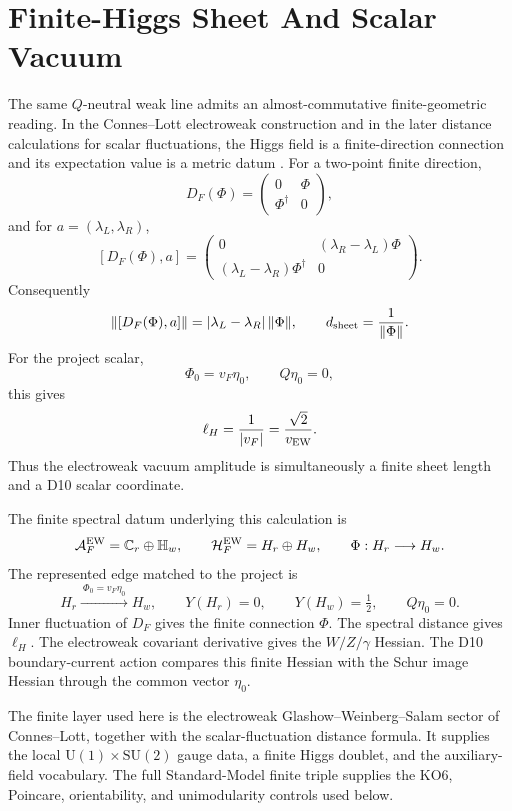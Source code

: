 \documentclass[11pt]{article}
\theoremstyle{definition}
\theoremstyle{remark}
\newcommand{\SU}{\mathrm{SU}}
\newcommand{\U}{\mathrm{U}}
\newcommand{\C}{\mathbb{C}}
\newcommand{\half}{\tfrac12}
\newcommand{\cA}{\mathcal A}
\newcommand{\cH}{\mathcal H}
\begin{document}

\section{Finite-Higgs Sheet And Scalar Vacuum}

The same \(Q\)-neutral weak line admits an almost-commutative
finite-geometric reading.  In the Connes--Lott electroweak construction and in
the later distance calculations for scalar fluctuations, the Higgs field is a
finite-direction connection and its expectation value is a metric datum
\cite{ConnesLott1990,Connes1989,MartinettiWulkenhaar2002}.  For a two-point
finite direction,
\[
  D_F(\Phi)=
  \begin{pmatrix}
  0&\Phi\\
  \Phi^\dagger&0
  \end{pmatrix},
\]
and for \(a=(\lambda_L,\lambda_R)\),
\[
  [D_F(\Phi),a]=
  \begin{pmatrix}
  0&(\lambda_R-\lambda_L)\Phi\\
  (\lambda_L-\lambda_R)\Phi^\dagger&0
  \end{pmatrix}.
\]
Consequently
\[
  \|[D_F(\Phi),a]\|
  =
  |\lambda_L-\lambda_R|\,\|\Phi\|,
  \qquad
  d_{\rm sheet}=\frac{1}{\|\Phi\|}.
\]
For the project scalar,
\[
  \Phi_0=v_F\eta_0,\qquad Q\eta_0=0,
\]
this gives
\[
  \ell_H=\frac{1}{|v_F|}
  =
  \frac{\sqrt2}{v_{\rm EW}}.
\]
Thus the electroweak vacuum amplitude is simultaneously a finite sheet length
and a D10 scalar coordinate.

The finite spectral datum underlying this calculation is
\[
  \cA_F^{\rm EW}=\C_r\oplus{\mathbb H}_w,\qquad
  \cH_F^{\rm EW}=H_r\oplus H_w,\qquad
  \Phi:H_r\longrightarrow H_w .
\]
The represented edge matched to the project is
\[
  H_r\xrightarrow{\ \Phi_0=v_F\eta_0\ }H_w,
  \qquad
  Y(H_r)=0,\qquad
  Y(H_w)=\half,\qquad
  Q\eta_0=0 .
\]
Inner fluctuation of \(D_F\) gives the finite connection \(\Phi\).  The
spectral distance gives \(\ell_H\).  The electroweak covariant derivative gives
the \(W/Z/\gamma\) Hessian.  The D10 boundary-current action compares this
finite Hessian with the Schur image Hessian through the common vector
\(\eta_0\).

The finite layer used here is the electroweak Glashow--Weinberg--Salam sector
of Connes--Lott, together with the scalar-fluctuation distance formula.  It
supplies the local \(\U(1)\times\SU(2)\) gauge data, a finite Higgs doublet,
and the auxiliary-field vocabulary.  The full Standard-Model finite triple
supplies the KO6, Poincare, orientability, and unimodularity controls used
below.
\end{document}
